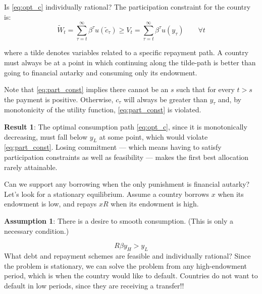 \documentclass[11pt, pdftex]{article}
\begin{document}
Is \eqref{eq:opt_c} individually rational?   The participation constraint for the country is:
\begin{equation} \label{eq:part_const}
{\tilde W_t} = \sum\limits_{\tau  = t}^\infty  {{\beta ^\tau }u\left( {{{\tilde c}_\tau }} \right)}  \geqslant {V_t} = \sum\limits_{\tau  = t}^\infty  {{\beta ^\tau }u\left( {{y_\tau }} \right) \qquad \forall t}
\end{equation}

where a tilde denotes variables related to a specific repayment path. A country must always be at a point in which continuing along the tilde-path is better than going to financial autarky and consuming only its endowment.

Note that \eqref{eq:part_const} implies there cannot be an $s$ such that for every $t>s$ the payment is positive.  Otherwise, ${c_\tau }$ will always be greater than  ${y_\tau }$ and, by monotonicity of the utility function, \eqref{eq:part_const} is violated.

\textbf{Result 1}: The optimal consumption path \eqref{eq:opt_c}, since it is monotonically decreasing, must fall below ${y_L}$ at some point, which would violate \eqref{eq:part_const}. Losing commitment --- which means having to satisfy participation constraints as well as feasibility --- makes the first best allocation rarely attainable.

Can we support any borrowing when the only punishment is financial autarky? Let's look for a stationary equilibrium.  Assume a country borrows $x$ when its endowment is low, and repays $xR$ when its endowment is high.

\textbf{Assumption 1}: There is a desire to smooth consumption. (This is only a necessary condition.)
	
\begin{equation}\label{eq:a1_cons_smooth}
    R\beta {y_H} > {y_L}
\end{equation}
What debt and repayment schemes are feasible and individually rational? Since the problem is stationary, we can solve the problem from any high-endowment period, which is when the country would like to default.  Countries do not want to default in low periods, since they are receiving a transfer!!
\end{document}
